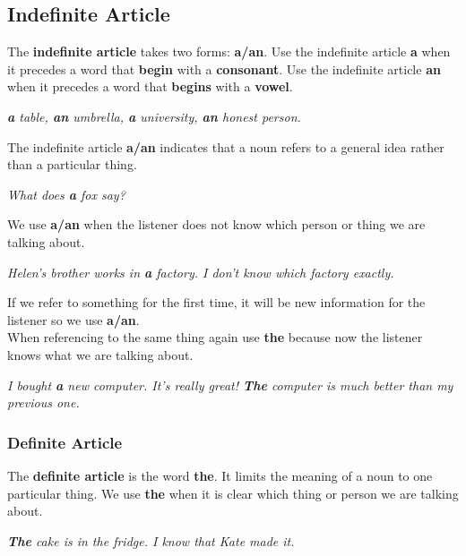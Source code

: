 \documentclass[10pt,a4paper]{article}
\begin{document}
\subsection{Indefinite Article}
The \textbf{indefinite article} takes two forms: \textbf{a/an}. Use the indefinite article \textbf{a} when it precedes a word that \textbf{begin} with a \textbf{consonant}. Use the indefinite article \textbf{an} when it precedes a word that \textbf{begins} with a \textbf{vowel}.
\begin{center}
		\textit{ \textbf{a} table, \textbf{an} umbrella, \textbf{a} university, \textbf{an} honest person.}
\end{center}
The indefinite article \textbf{a/an} indicates that a noun refers to a general idea rather than a particular thing.
\begin{center}
\textit{What does \textbf{a} fox say?}
\end{center}
We use \textbf{a/an} when the listener does not know which person or thing we are talking about.
\begin{center}
		\textit{Helen's brother works in \textbf{a} factory. I don't know which factory exactly.}
\end{center}
\newpage
If we refer to something for the first time, it will be new information for the listener so we use \textbf{a/an}.\\
When referencing to the same thing again use \textbf{the} because now the listener knows what we are talking about.
\begin{center}
\textit{I bought \textbf{a} new computer. It's really great! \textbf{The} computer is much better than my previous one.}
\end{center}

\subsubsection{Definite Article}
The \textbf{definite article} is the word \textbf{the}. It limits the meaning of a noun to one particular thing. We use \textbf{the} when it is clear which thing or person we are talking about.
\begin{center}
\textit{ \textbf{The} cake is in the fridge. I know that Kate made it.}
\end{center}
\end{document}
